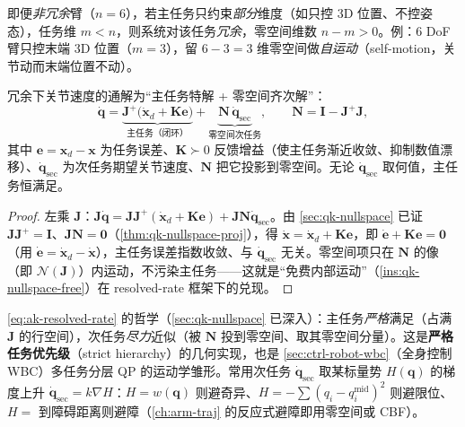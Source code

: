 \begin{definition}[降维造冗余]\label{def:ak-redundancy}
即便\emph{非冗余}臂（$n=6$），若主任务只约束\emph{部分}维度（如只控 3D 位置、不控姿态），任务维 $m<n$，则系统对该任务\emph{冗余}，零空间维数 $n-m>0$。例：6 DoF 臂只控末端 3D 位置（$m=3$），留 $6-3=3$ 维零空间做\emph{自运动}（self-motion，关节动而末端位置不动）。
\end{definition}

\begin{theorem}\label{thm:ak-resolved-rate}
冗余下关节速度的通解为“主任务特解 + 零空间齐次解”\cite{lynch2017modern}：
\begin{equation}
  \boxed{\dot{\mathbf{q}}=\underbrace{\mathbf{J}^{+}\big(\dot{\mathbf{x}}_d+\mathbf{K}\mathbf{e}\big)}_{\text{主任务（闭环）}}+\underbrace{\mathbf{N}\,\dot{\mathbf{q}}_{\text{sec}}}_{\text{零空间次任务}},\qquad \mathbf{N}=\mathbf{I}-\mathbf{J}^{+}\mathbf{J},}
  \label{eq:ak-resolved-rate}
\end{equation}
其中 $\mathbf{e}=\mathbf{x}_d-\mathbf{x}$ 为任务误差、$\mathbf{K}\succ0$ 反馈增益（使主任务渐近收敛、抑制数值漂移）、$\dot{\mathbf{q}}_{\text{sec}}$ 为次任务期望关节速度、$\mathbf{N}$ 把它投影到零空间。无论 $\dot{\mathbf{q}}_{\text{sec}}$ 取何值，主任务恒满足。
\end{theorem}
\begin{proof}
左乘 $\mathbf{J}$：$\mathbf{J}\dot{\mathbf{q}}=\mathbf{J}\mathbf{J}^{+}(\dot{\mathbf{x}}_d+\mathbf{K}\mathbf{e})+\mathbf{J}\mathbf{N}\dot{\mathbf{q}}_{\text{sec}}$。由 \cref{sec:qk-nullspace} 已证 $\mathbf{J}\mathbf{J}^{+}=\mathbf{I}$、$\mathbf{J}\mathbf{N}=\mathbf{0}$（\cref{thm:qk-nullspace-proj}），得 $\dot{\mathbf{x}}=\dot{\mathbf{x}}_d+\mathbf{K}\mathbf{e}$，即 $\dot{\mathbf{e}}+\mathbf{K}\mathbf{e}=\mathbf{0}$（用 $\dot{\mathbf{e}}=\dot{\mathbf{x}}_d-\dot{\mathbf{x}}$），主任务误差指数收敛、与 $\dot{\mathbf{q}}_{\text{sec}}$ 无关。零空间项只在 $\mathbf{N}$ 的像（即 $\mathcal{N}(\mathbf{J})$）内运动，不污染主任务——这就是“免费内部运动”（\cref{ins:qk-nullspace-free}）在 resolved-rate 框架下的兑现。
\end{proof}

\begin{insight}
\cref{eq:ak-resolved-rate} 的哲学（\cref{sec:qk-nullspace} 已深入）：主任务\emph{严格}满足（占满 $\mathbf{J}$ 的行空间），次任务\emph{尽力}近似（被 $\mathbf{N}$ 投到零空间、取其零空间分量）。这是\textbf{严格任务优先级}（strict hierarchy）的几何实现，也是 \cref{sec:ctrl-robot-wbc}（全身控制 WBC）多任务分层 QP 的运动学雏形。常用次任务 $\dot{\mathbf{q}}_{\text{sec}}$ 取某标量势 $H(\mathbf{q})$ 的梯度上升 $\dot{\mathbf{q}}_{\text{sec}}=k\nabla H$：$H=w(\mathbf{q})$ 则避奇异、$H=-\sum(q_i-q_i^{\text{mid}})^2$ 则避限位、$H=$ 到障碍距离则避障（\cref{ch:arm-traj} 的反应式避障即用零空间或 CBF）。
\end{insight}

